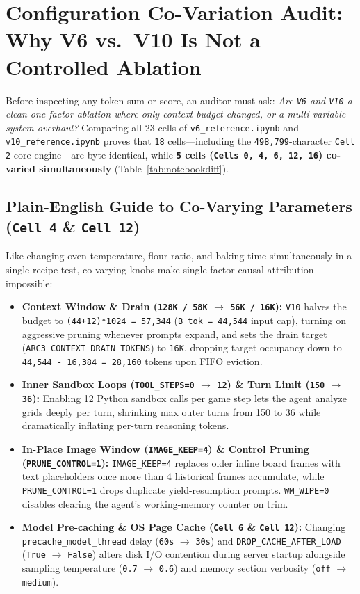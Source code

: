 \documentclass[10pt]{article}
\newcommand{\code}[1]{\texttt{#1}}
\begin{document}
\section{Configuration Co-Variation Audit: Why V6 vs.\ V10 Is Not a Controlled Ablation}
\label{sec:config}

Before inspecting any token sum or score, an auditor must ask: \emph{Are \code{V6} and \code{V10} a clean one-factor ablation where only context budget changed, or a multi-variable system overhaul?} Comparing all 23 cells of \code{v6\_reference.ipynb} and \code{v10\_reference.ipynb} proves that \code{18} cells---including the \code{498,799}-character \code{Cell 2} core engine---are byte-identical, while \textbf{\code{5} cells (\code{Cells 0, 4, 6, 12, 16}) co-varied simultaneously} (Table~\ref{tab:notebookdiff}).

\subsection{Plain-English Guide to Co-Varying Parameters (\code{Cell 4} \& \code{Cell 12})}
Like changing oven temperature, flour ratio, and baking time simultaneously in a single recipe test, co-varying knobs make single-factor causal attribution impossible:
\begin{itemize}[leftmargin=1.4em,itemsep=2pt]
\item \textbf{Context Window \& Drain (\code{128K / 58K} $\to$ \code{56K / 16K}):} \code{V10} halves the budget to \code{(44+12)*1024 = 57,344} (\code{B\_tok = 44,544} input cap), turning on aggressive pruning whenever prompts expand, and sets the drain target (\code{ARC3\_CONTEXT\_DRAIN\_TOKENS}) to \code{16K}, dropping target occupancy down to \code{44,544 - 16,384 = 28,160} tokens upon FIFO eviction.
\item \textbf{Inner Sandbox Loops (\code{TOOL\_STEPS=0} $\to$ \code{12}) \& Turn Limit (\code{150} $\to$ \code{36}):} Enabling 12 Python sandbox calls per game step lets the agent analyze grids deeply per turn, shrinking max outer turns from 150 to 36 while dramatically inflating per-turn reasoning tokens.
\item \textbf{In-Place Image Window (\code{IMAGE\_KEEP=4}) \& Control Pruning (\code{PRUNE\_CONTROL=1}):} \code{IMAGE\_KEEP=4} replaces older inline board frames with text placeholders once more than 4 historical frames accumulate, while \code{PRUNE\_CONTROL=1} drops duplicate yield-resumption prompts. \code{WM\_WIPE=0} disables clearing the agent's working-memory counter on trim.
\item \textbf{Model Pre-caching \& OS Page Cache (\code{Cell 6} \& \code{Cell 12}):} Changing \code{precache\_model\_thread} delay (\code{60s} $\to$ \code{30s}) and \code{DROP\_CACHE\_AFTER\_LOAD} (\code{True} $\to$ \code{False}) alters disk I/O contention during server startup alongside sampling temperature (\code{0.7} $\to$ \code{0.6}) and memory section verbosity (\code{off} $\to$ \code{medium}).
\end{itemize}
\end{document}
